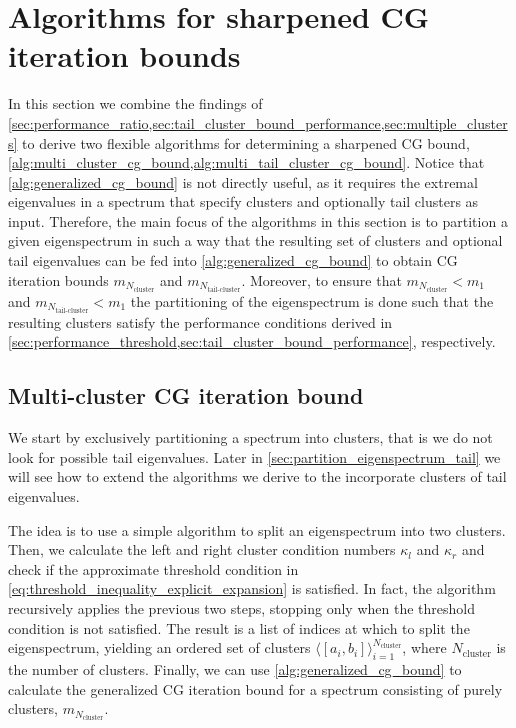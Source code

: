 \section{Algorithms for sharpened CG iteration bounds}\label{sec:cg_iteration_bound_algorithm}
In this section we combine the findings of \cref{sec:performance_ratio,sec:tail_cluster_bound_performance,sec:multiple_clusters} to derive two flexible algorithms for determining a sharpened CG bound, \cref{alg:multi_cluster_cg_bound,alg:multi_tail_cluster_cg_bound}. Notice that \cref{alg:generalized_cg_bound} is not directly useful, as it requires the extremal eigenvalues in a spectrum that specify clusters and optionally tail clusters as input. Therefore, the main focus of the algorithms in this section is to partition a given eigenspectrum in such a way that the resulting set of clusters and optional tail eigenvalues can be fed into \cref{alg:generalized_cg_bound} to obtain CG iteration bounds $m_{N_{\text{cluster}}}$ and $m_{N_{\text{tail-cluster}}}$. Moreover, to ensure that $m_{N_{\text{cluster}}} < m_1$ and $m_{N_{\text{tail-cluster}}} < m_1$ the partitioning of the eigenspectrum is done such that the resulting clusters satisfy the performance conditions derived in \cref{sec:performance_threshold,sec:tail_cluster_bound_performance}, respectively.

\subsection{Multi-cluster CG iteration bound}\label{sec:partition_eigenspectrum}
We start by exclusively partitioning a spectrum into clusters, that is we do not look for possible tail eigenvalues. Later in \cref{sec:partition_eigenspectrum_tail} we will see how to extend the algorithms we derive to the incorporate clusters of tail eigenvalues. 

The idea is to use a simple algorithm to split an eigenspectrum into two clusters. Then, we calculate the left and right cluster condition numbers $\kappa_l$ and $\kappa_r$ and check if the approximate threshold condition in \cref{eq:threshold_inequality_explicit_expansion} is satisfied. In fact, the algorithm recursively applies the previous two steps, stopping only when the threshold condition is not satisfied. The result is a list of indices at which to split the eigenspectrum, yielding an ordered set of clusters $\langle[a_i, b_i]\rangle_{i=1}^{N_{\text{cluster}}}$, where $N_{\text{cluster}}$ is the number of clusters. Finally, we can use \cref{alg:generalized_cg_bound} to calculate the generalized CG iteration bound for a spectrum consisting of purely clusters, $m_{N_{\text{cluster}}}$.

